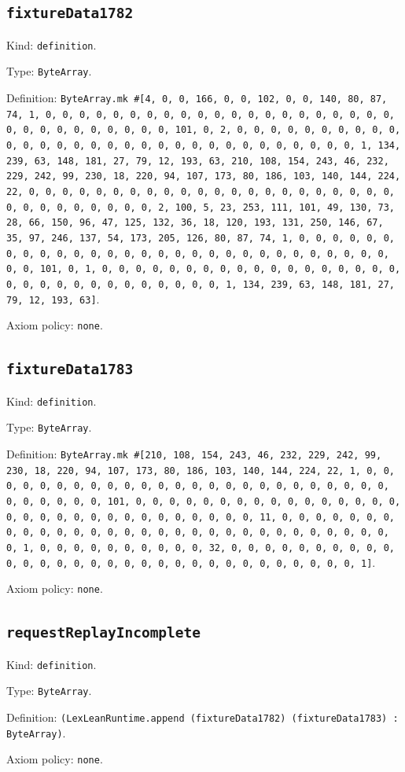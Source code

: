 \documentclass[11pt]{article}
\begin{document}
\subsection*{\texttt{fixtureData1782}}
\noindent Kind: \texttt{definition}.\par
\noindent Type: \texttt{ByteArray}.\par
\noindent Definition: \texttt{ByteArray.mk \#[4, 0, 0, 166, 0, 0, 102, 0, 0, 140, 80, 87, 74, 1, 0, 0, 0, 0, 0, 0, 0, 0, 0, 0, 0, 0, 0, 0, 0, 0, 0, 0, 0, 0, 0, 0, 0, 0, 0, 0, 0, 0, 0, 0, 0, 101, 0, 2, 0, 0, 0, 0, 0, 0, 0, 0, 0, 0, 0, 0, 0, 0, 0, 0, 0, 0, 0, 0, 0, 0, 0, 0, 0, 0, 0, 0, 0, 0, 0, 1, 134, 239, 63, 148, 181, 27, 79, 12, 193, 63, 210, 108, 154, 243, 46, 232, 229, 242, 99, 230, 18, 220, 94, 107, 173, 80, 186, 103, 140, 144, 224, 22, 0, 0, 0, 0, 0, 0, 0, 0, 0, 0, 0, 0, 0, 0, 0, 0, 0, 0, 0, 0, 0, 0, 0, 0, 0, 0, 0, 0, 0, 0, 0, 2, 100, 5, 23, 253, 111, 101, 49, 130, 73, 28, 66, 150, 96, 47, 125, 132, 36, 18, 120, 193, 131, 250, 146, 67, 35, 97, 246, 137, 54, 173, 205, 126, 80, 87, 74, 1, 0, 0, 0, 0, 0, 0, 0, 0, 0, 0, 0, 0, 0, 0, 0, 0, 0, 0, 0, 0, 0, 0, 0, 0, 0, 0, 0, 0, 0, 0, 0, 101, 0, 1, 0, 0, 0, 0, 0, 0, 0, 0, 0, 0, 0, 0, 0, 0, 0, 0, 0, 0, 0, 0, 0, 0, 0, 0, 0, 0, 0, 0, 0, 0, 0, 1, 134, 239, 63, 148, 181, 27, 79, 12, 193, 63]}.\par
\noindent Axiom policy: \texttt{none}.\par
\subsection*{\texttt{fixtureData1783}}
\noindent Kind: \texttt{definition}.\par
\noindent Type: \texttt{ByteArray}.\par
\noindent Definition: \texttt{ByteArray.mk \#[210, 108, 154, 243, 46, 232, 229, 242, 99, 230, 18, 220, 94, 107, 173, 80, 186, 103, 140, 144, 224, 22, 1, 0, 0, 0, 0, 0, 0, 0, 0, 0, 0, 0, 0, 0, 0, 0, 0, 0, 0, 0, 0, 0, 0, 0, 0, 0, 0, 0, 0, 0, 0, 0, 101, 0, 0, 0, 0, 0, 0, 0, 0, 0, 0, 0, 0, 0, 0, 0, 0, 0, 0, 0, 0, 0, 0, 0, 0, 0, 0, 0, 0, 0, 0, 0, 11, 0, 0, 0, 0, 0, 0, 0, 0, 0, 0, 0, 0, 0, 0, 0, 0, 0, 0, 0, 0, 0, 0, 0, 0, 0, 0, 0, 0, 0, 0, 0, 1, 0, 0, 0, 0, 0, 0, 0, 0, 0, 0, 32, 0, 0, 0, 0, 0, 0, 0, 0, 0, 0, 0, 0, 0, 0, 0, 0, 0, 0, 0, 0, 0, 0, 0, 0, 0, 0, 0, 0, 0, 0, 0, 1]}.\par
\noindent Axiom policy: \texttt{none}.\par
\subsection*{\texttt{requestReplayIncomplete}}
\noindent Kind: \texttt{definition}.\par
\noindent Type: \texttt{ByteArray}.\par
\noindent Definition: \texttt{(LexLeanRuntime.append (fixtureData1782) (fixtureData1783) : ByteArray)}.\par
\noindent Axiom policy: \texttt{none}.\par
\end{document}
